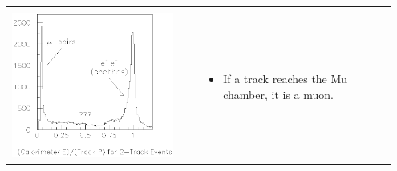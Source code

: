 \begin{slide*}
\begin{minipage}[t]{\linewidth}
\begin{tabular}{p{0.45\linewidth} c p{0.5\linewidth}}
\begin{minipage}{\linewidth}
\begin{itemize}
      \item \begin{minipage}{\linewidth}
              {\large Energy deposited in Calorimeter:} \\
	      \includegraphics[height=6 cm]{cc.eps}
	    \end{minipage}
    \end{itemize}
  \end{minipage} & &
  \begin{minipage}{0.9\linewidth}
    \begin{itemize}
      \item If a track reaches the {\sc Mu} chamber, it is a muon.
    \end{itemize}
  \end{minipage} \\
\end{tabular}

\end{minipage}
\end{slide*}


